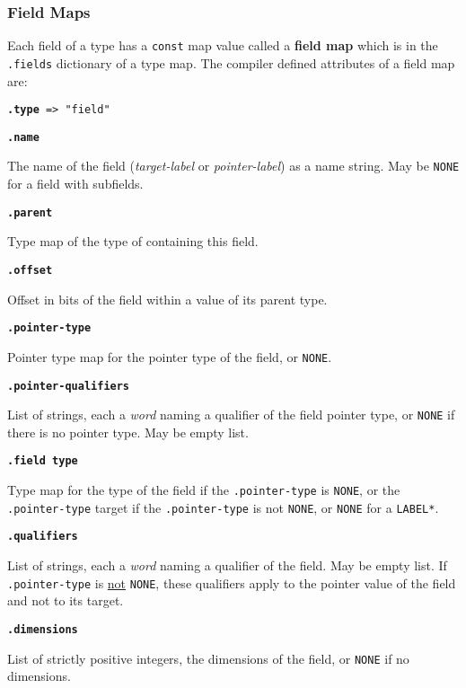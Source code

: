 \documentclass[12pt]{article}
\newcommand{\key}[1]{{\rm \bfseries #1}}
\newcommand{\ttkey}[1]{{\tt \bfseries #1}}
\newenvironment{indpar}[1][0.3in]%
	{\begin{list}{}%
		     {\setlength{\itemsep}{0in}%
		      \setlength{\topsep}{0in}%
		      \setlength{\parsep}{1ex}%
		      \setlength{\labelwidth}{#1}%
		      \setlength{\leftmargin}{#1}%
		      \addtolength{\leftmargin}{\labelsep}}%
	 \item}%
	{\end{list}}
\begin{document}
\subsubsection{Field Maps}
\label{FIELD-MAPS}

Each field of a type has a {\tt const} map value called
a \key{field map} which is in the {\tt .fields} dictionary of
a type map.  The compiler defined attributes of a field map are:

{\tt \ttkey{.type} => "field"}

\ttkey{.name}
\begin{indpar}
The name of the field ({\em target-label} or {\em pointer-label})
as a name string.  May be {\tt NONE} for a field with subfields.
\end{indpar}

\ttkey{.parent}
\begin{indpar}
Type map of the type of containing this field.
\end{indpar}

\ttkey{.offset}
\begin{indpar}
Offset in bits of the field within a value of its parent type.
\end{indpar}

\ttkey{.pointer-type}
\begin{indpar}
Pointer type map for the pointer type of the field,
or {\tt NONE}.
\end{indpar}

\ttkey{.pointer-qualifiers}
\begin{indpar}
List of strings, each a {\em word} naming a qualifier
of the field pointer type, or {\tt NONE} if there is no
pointer type.  May be empty list.
\end{indpar}

\ttkey{.field type}
\begin{indpar}
Type map for the type of the field if the {\tt .pointer-type}
is {\tt NONE}, or the {\tt .pointer-type} target if the
{\tt .pointer-type} is not {\tt NONE}, or {\tt NONE}
for a {\tt *LABEL*}.
\end{indpar}

\ttkey{.qualifiers}
\begin{indpar}
List of strings, each a {\em word} naming a qualifier
of the field.  May be empty list.
If {\tt .pointer-type} is \underline{not} {\tt NONE},
these qualifiers apply to the pointer value of the field
and not to its target.
\end{indpar}

\ttkey{.dimensions}
\begin{indpar}
List of strictly positive integers, the dimensions of the field, or {\tt NONE}
if no dimensions.
\end{indpar}
\end{document}
